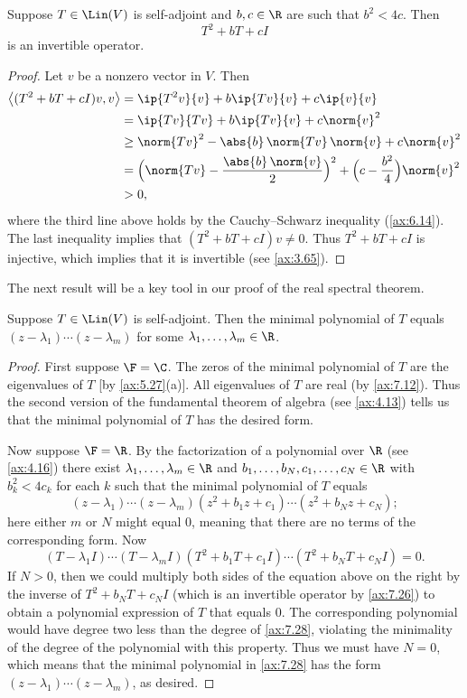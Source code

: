 \begin{result}\label{ax:7.26}
Suppose $T\in\Lin(V)$ is self-adjoint and $b,c\in\R$ are such that $b^2<4c$.
Then
\[ T^2+bT+cI \]
is an invertible operator.
\end{result}

\begin{proof}
Let $v$ be a nonzero vector in $V$. Then
\begin{align*}
\bigl\langle (T^2+bT+cI)v,v\bigr\rangle
  &= \ip{T^2v}{v}+b\ip{Tv}{v}+c\ip{v}{v}\\
  &= \ip{Tv}{Tv}+b\ip{Tv}{v}+c\norm{v}^2\\
  &\ge \norm{Tv}^2-\abs{b}\,\norm{Tv}\,\norm{v}+c\norm{v}^2\\
  &= \Bigl(\norm{Tv}-\frac{\abs{b}\,\norm{v}}{2}\Bigr)^2
     +\Bigl(c-\frac{b^2}{4}\Bigr)\norm{v}^2\\
  &> 0,
\end{align*}
where the third line above holds by the Cauchy--Schwarz inequality
(\ref{ax:6.14}). The last inequality implies that $(T^2+bT+cI)v\ne0$. Thus
$T^2+bT+cI$ is injective, which implies that it is invertible (see
\ref{ax:3.65}).
\end{proof}

The next result will be a key tool in our proof of the real spectral theorem.

\begin{result}\label{ax:7.27}
Suppose $T\in\Lin(V)$ is self-adjoint. Then the minimal polynomial of $T$
equals $(z-\lambda_1)\cdots(z-\lambda_m)$ for some
$\lambda_1,\dots,\lambda_m\in\R$.
\end{result}

\begin{proof}
First suppose $\F=\C$. The zeros of the minimal polynomial of $T$ are the
eigenvalues of $T$ [by \ref{ax:5.27}(a)]. All eigenvalues of $T$ are real (by
\ref{ax:7.12}). Thus the second version of the fundamental theorem of algebra
(see \ref{ax:4.13}) tells us that the minimal polynomial of $T$ has the desired
form.

Now suppose $\F=\R$. By the factorization of a polynomial over $\R$ (see
\ref{ax:4.16}) there exist $\lambda_1,\dots,\lambda_m\in\R$ and
$b_1,\dots,b_N,c_1,\dots,c_N\in\R$ with $b_k^2<4c_k$ for each $k$ such that the
minimal polynomial of $T$ equals
\[ (z-\lambda_1)\cdots(z-\lambda_m)(z^2+b_1z+c_1)\cdots(z^2+b_Nz+c_N);
   \tag{\thetheorem} \]
here either $m$ or $N$ might equal $0$, meaning that there are no terms of the
corresponding form. Now
\[ (T-\lambda_1I)\cdots(T-\lambda_mI)(T^2+b_1T+c_1I)\cdots(T^2+b_NT+c_NI) = 0. \]
If $N>0$, then we could multiply both sides of the equation above on the right
by the inverse of $T^2+b_NT+c_NI$ (which is an invertible operator by
\ref{ax:7.26}) to obtain a polynomial expression of $T$ that equals $0$. The
corresponding polynomial would have degree two less than the degree of
\ref{ax:7.28}, violating the minimality of the degree of the polynomial with
this property. Thus we must have $N=0$, which means that the minimal polynomial
in \ref{ax:7.28} has the form $(z-\lambda_1)\cdots(z-\lambda_m)$, as desired.
\end{proof}


